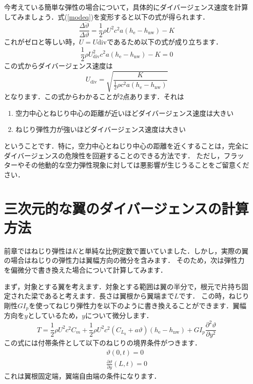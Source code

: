 \documentclass{jarticle}
\begin{document}
今考えている簡単な弾性の場合について，具体的にダイバージェンス速度を計算してみましょう．式(\ref{modeq})を変形すると以下の式が得られます．
\begin{equation}
    \frac{\Delta \ddot{\vartheta}}{\Delta \vartheta} = \frac{1}{2}\rho U^2 c^2 a  (h_\mathrm{e}-h_\mathrm{nw}) - K
\end{equation}
これがゼロと等しい時，$U=U\mathrm{div}$であるため以下の式が成り立ちます．
\begin{equation}\label{Tv}
    \frac{1}{2}\rho U_\mathrm{div}^2 c^2 a  (h_\mathrm{e}-h_\mathrm{nw}) - K = 0
\end{equation}
この式からダイバージェンス速度は
\begin{equation}
    U_\mathrm{div} = \sqrt{\frac{K}{\frac{1}{2}\rho c^2 a  (h_\mathrm{e}-h_\mathrm{nw})}}
\end{equation}
となります．この式からわかることが2点あります．それは
\begin{enumerate}
    \item 空力中心とねじり中心の距離が近いほどダイバージェンス速度は大きい
    \item ねじり弾性力が強いほどダイバージェンス速度は大きい
\end{enumerate}
ということです．特に，空力中心とねじり中心の距離を近くすることは，完全にダイバージェンスの危険性を回避することのできる方法です．
ただし，フラッターやその他動的な空力弾性現象に対しては悪影響が生じうることをご留意ください．

\section{三次元的な翼のダイバージェンスの計算方法}

前章ではねじり弾性は$K$と単純な比例定数で置いていました．しかし，実際の翼の場合はねじりの弾性力は翼幅方向の微分を含みます．
そのため，次は弾性力を偏微分で書き換えた場合について計算してみます．

まず，対象とする翼を考えます．対象とする範囲は翼の半分で，根元で片持ち固定された梁であると考えます．長さは翼根から翼端まで$L$です．
この時，ねじり剛性$GI_p$を使ってねじり弾性力を以下のように書き換えることができます．翼幅方向を$y$としているため，$y$について微分します．
\begin{equation} \label{gip}
    T = \frac{1}{2}\rho U^2 c^2 C_m + \frac{1}{2}\rho U^2 c^2 (C_{L_0} + a\vartheta)  (h_\mathrm{e}-h_\mathrm{nw}) + GI_p \frac{\partial^2 \vartheta}{\partial y^2}
\end{equation}
この式には付帯条件として以下のねじりの境界条件がつきます．
\begin{align}
    \vartheta(0,t) = 0 \\
    \frac{\partial \vartheta}{\partial y}(L,t) = 0
\end{align}
これは翼根固定端，翼端自由端の条件になります．
\end{document}
